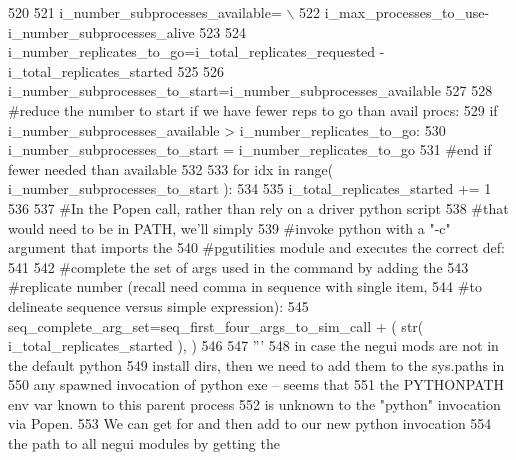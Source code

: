 \begin{DoxyCode}
520 
521                 i\_number\_subprocesses\_available= \(\backslash\)
522                         i\_max\_processes\_to\_use-i\_number\_subprocesses\_alive
523 
524                 i\_number\_replicates\_to\_go=i\_total\_replicates\_requested - i\_total\_replicates\_started
525 
526                 i\_number\_subprocesses\_to\_start=i\_number\_subprocesses\_available
527 
528                 \textcolor{comment}{#reduce the number to start if we have fewer reps to go than avail procs:}
529                 \textcolor{keywordflow}{if} i\_number\_subprocesses\_available > i\_number\_replicates\_to\_go:
530                         i\_number\_subprocesses\_to\_start = i\_number\_replicates\_to\_go
531                 \textcolor{comment}{#end if fewer needed than available}
532 
533                 \textcolor{keywordflow}{for} idx \textcolor{keywordflow}{in} range( i\_number\_subprocesses\_to\_start ):
534 
535                     i\_total\_replicates\_started += 1
536                     
537                     \textcolor{comment}{#In the Popen call, rather than rely on a driver python script }
538                     \textcolor{comment}{#that would need to be in PATH, we'll simply}
539                     \textcolor{comment}{#invoke python with a "-c" argument that imports the }
540                     \textcolor{comment}{#pgutilities module and executes the correct def:}
541             
542                     \textcolor{comment}{#complete the set of args used in the command by adding the}
543                     \textcolor{comment}{#replicate number (recall need comma in sequence with single item,}
544                     \textcolor{comment}{#to delineate sequence versus simple expression):}
545                     seq\_complete\_arg\_set=seq\_first\_four\_args\_to\_sim\_call + ( str( 
      i\_total\_replicates\_started ), )
546 
547                     \textcolor{stringliteral}{'''}
548 \textcolor{stringliteral}{                    in case the negui mods are not in the default python }
549 \textcolor{stringliteral}{                    install dirs, then we need to add them to the sys.paths in}
550 \textcolor{stringliteral}{                    any  spawned invocation of python exe -- seems that }
551 \textcolor{stringliteral}{                    the PYTHONPATH env var known to this parent process }
552 \textcolor{stringliteral}{                    is unknown to the "python" invocation via Popen.  }
553 \textcolor{stringliteral}{                    We can get for and then add to our new python invocation}
554 \textcolor{stringliteral}{                    the path to all negui modules by getting the}

\end{DoxyCode}
